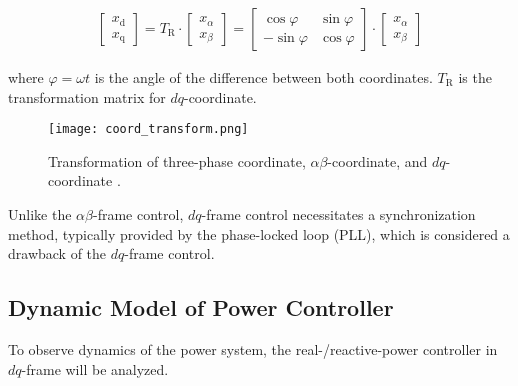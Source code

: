 \begin{equation}
    \begin{aligned}
        \left[\begin{array}{l}
        x_{\mathrm{d}} \\
        x_{\mathrm{q}}
        \end{array}\right]=T_{\mathrm{R}} \cdot\left[\begin{array}{l}
        x_\alpha \\
        x_\beta
        \end{array}\right]=\left[\begin{array}{cc}
        \cos \varphi & \sin \varphi \\
        -\sin \varphi & \cos \varphi
        \end{array}\right] \cdot\left[\begin{array}{l}
        x_\alpha \\
        x_\beta
        \end{array}\right]
    \end{aligned}
\end{equation}

where $\varphi=\omega t$ is the angle of the difference between both coordinates. $T_{\mathrm{R}}$ is the transformation matrix for $dq$-coordinate.

\begin{figure}[htbp]
    \centering
    \texttt{[image: coord\_transform.png]}
    \caption{Transformation of three-phase coordinate, $\alpha \beta$-coordinate, and $dq$-coordinate \autocite{Kalachev2013}.}
    \label{fig:coord_transform}
\end{figure}

Unlike the $\alpha \beta$-frame control, $dq$-frame control necessitates a synchronization method, typically provided by the phase-locked loop (PLL), which is considered a drawback of the $dq$-frame control.

\subsection{Dynamic Model of Power Controller}\label{subsec:ch3/sec2/sub2}
To observe dynamics of the power system, the real-/reactive-power controller in $dq$-frame will be analyzed.


